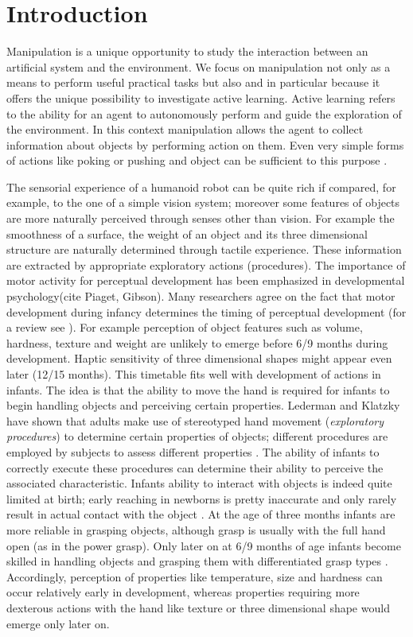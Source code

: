 \section{Introduction}
Manipulation is a unique opportunity to study the interaction between an artificial system and the environment. We focus on manipulation not only as a means to perform useful practical tasks but also and in particular because it offers the unique possibility to investigate active learning. Active learning refers to the ability for an agent to autonomously perform and guide the exploration of the environment. In this context manipulation allows the agent to collect information about objects by performing action on them. Even very simple forms of actions like poking or pushing and object can be sufficient to this purpose \cite{fitzpatrick03learning}.

The sensorial experience of a humanoid robot can be quite rich if compared, for example, to the one of a simple vision system; moreover some features of objects are more naturally perceived through senses other than vision. For example the smoothness of a surface, the weight of an object and its three dimensional structure are naturally determined through tactile experience. These information are extracted by appropriate exploratory actions (procedures).
The importance of motor activity for perceptual development has been emphasized in developmental psychology(cite Piaget, Gibson). Many researchers agree on the fact that motor development during infancy determines the timing of perceptual development (for a review see \cite{bushnell93motor}). For example perception of object features such as volume, hardness, texture and weight are unlikely to emerge before 6/9 months during development. Haptic sensitivity of three dimensional shapes might appear even later (12/15 months). This timetable fits well with development of actions in infants. The idea is that the ability to move the hand is required for infants to begin handling objects and perceiving certain properties. Lederman and Klatzky have shown that adults make use of stereotyped hand movement (\emph{exploratory procedures}) to determine certain properties of objects; different procedures are employed by subjects to assess different properties \cite{lederman87hand}. The ability of infants to correctly execute these procedures can determine their ability to perceive the associated characteristic. Infants ability to interact with objects is indeed quite limited at birth; early reaching in newborns is pretty inaccurate and only rarely result in actual contact with the object \cite{hofsten82eye-hand}. At the age of three months infants are more reliable in grasping objects, although grasp is usually with the full hand open (as in the power grasp). Only later on at 6/9 months of age infants become skilled in handling objects and grasping them with differentiated grasp types \cite{hofsten93thestructuring}. Accordingly, perception of properties like temperature, size and hardness can occur relatively early in development, whereas properties requiring more dexterous actions with the hand like texture or three dimensional shape would emerge only later on.

